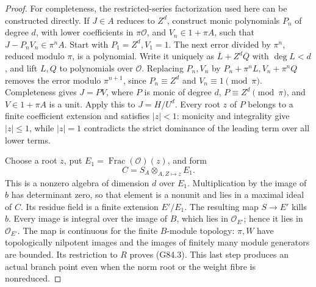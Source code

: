 \begin{proof}
For completeness, the restricted-series factorization used here
can be constructed directly. If \(J\in A\) reduces to \(Z^d\),
construct monic polynomials \(P_n\) of degree \(d\), with lower
coefficients in \(\pi\mathcal O\), and \(V_n\in1+\pi A\), such that
\(J-P_nV_n\in\pi^nA\). Start with \(P_1=Z^d,V_1=1\).
The next error divided by \(\pi^n\), reduced modulo \(\pi\), is
a polynomial. Write it uniquely as
\(\overline L+Z^d\overline Q\) with \(\deg L<d\), and lift \(L,Q\)
to polynomials over \(\mathcal O\).
Replacing \(P_n,V_n\) by \(P_n+\pi^nL,V_n+\pi^nQ\) removes the
error modulo \(\pi^{n+1}\), since \(P_n\equiv Z^d\) and
\(V_n\equiv1\pmod\pi\). Completeness gives \(J=PV\),
where \(P\) is monic of degree \(d\), \(P\equiv Z^d\pmod\pi\),
and \(V\in1+\pi A\) is a unit.
Apply this to \(J=H/U^d\).
Every root \(z\) of \(P\) belongs to a finite coefficient extension
and satisfies \(|z|<1\): monicity and integrality give \(|z|\leq1\),
while \(|z|=1\) contradicts the strict dominance of the leading
term over all lower terms.

Choose a root \(z\), put
\(E_1=\operatorname{Frac}(\mathcal O)(z)\), and form
\[
 C=S_A\otimes_{A,Z\mapsto z}E_1.
\]
This is a nonzero algebra of dimension \(d\) over \(E_1\).
Multiplication by the image of \(b\) has determinant zero, so that
element is a nonunit and lies in a maximal ideal of \(C\).
Its residue field is a finite extension \(E'/E_1\).
The resulting map \(S\to E'\) kills \(b\).
Every image is integral over the image of \(B\), which lies in
\(\mathcal O_{E'}\); hence it lies in \(\mathcal O_{E'}\).
The map is continuous for the finite \(B\)-module topology:
\(\pi,W\) have topologically nilpotent images and the images of
finitely many module generators are bounded.
Its restriction to \(R\) proves (G84.3).
This last step produces an actual branch point even when the
norm root or the weight fibre is nonreduced.
\end{proof}

